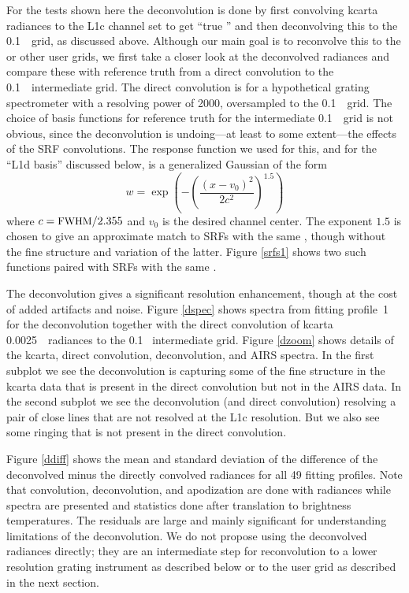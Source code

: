 \documentclass[11pt]{article}
\begin{document}
For the tests shown here the deconvolution is done by first
convolving kcarta radiances to the {\airs} L1c channel set to get
``true {\airs}'' and then deconvolving this to the 0.1~\wn\ grid, as
discussed above.  Although our main goal is to reconvolve this to the
{\cris} or other user grids, we first take a closer look at the
deconvolved radiances and compare these with reference truth from a
direct convolution to the 0.1~\wn\ intermediate grid.  The direct
convolution is for a hypothetical grating spectrometer with a
resolving power of 2000, oversampled to the 0.1~\wn\ grid.  The
choice of basis functions for reference truth for the intermediate
0.1~\wn\ grid is not obvious, since the deconvolution is undoing---at
least to some extent---the effects of the {\airs} SRF convolutions.
The response function we used for this, and for the {\airs} ``L1d
basis'' discussed below, is a generalized Gaussian of the form
\[w = \exp\left(-\left(\frac{(x - v_0)^2}{2c^2}\right)^{1.5}\right) \]
where $c=\mbox{\small FWHM} / 2.355$ and $v_0$ is the desired channel center.  The
exponent $1.5$ is chosen to give an approximate match to {\airs} SRFs
with the same \fwhm, though without the fine structure and variation
of the latter.  Figure \ref{srfs1} shows two such functions paired
with {\airs} SRFs with the same \fwhm.

The {\airs} deconvolution gives a significant resolution enhancement,
though at the cost of added artifacts and noise.  Figure \ref{dspec}
shows spectra from fitting profile~1 \cite{sarta1,sarta2} for the
deconvolution together with the direct convolution of kcarta
0.0025~\wn\ radiances to the 0.1~{\wn} intermediate grid.  Figure
\ref{dzoom} shows details of the kcarta, direct convolution,
deconvolution, and AIRS spectra.  In the first subplot we see the
deconvolution is capturing some of the fine structure in the kcarta
data that is present in the direct convolution but not in the AIRS
data.  In the second subplot we see the deconvolution (and direct
convolution) resolving a pair of close lines that are not resolved at
the {\airs} L1c resolution.  But we also see some ringing that is not
present in the direct convolution.

Figure \ref{ddiff} shows the mean and standard deviation of the
difference of the deconvolved minus the directly convolved radiances
for all 49 fitting profiles.  Note that convolution, deconvolution,
and apodization are done with radiances while spectra are presented
and statistics done after translation to brightness temperatures.
The residuals are large and mainly significant for understanding
limitations of the deconvolution.  We do not propose using the
deconvolved radiances directly; they are an intermediate step for
reconvolution to a lower resolution grating instrument as described
below or to the {\cris} user grid as described in the next section.
\end{document}
